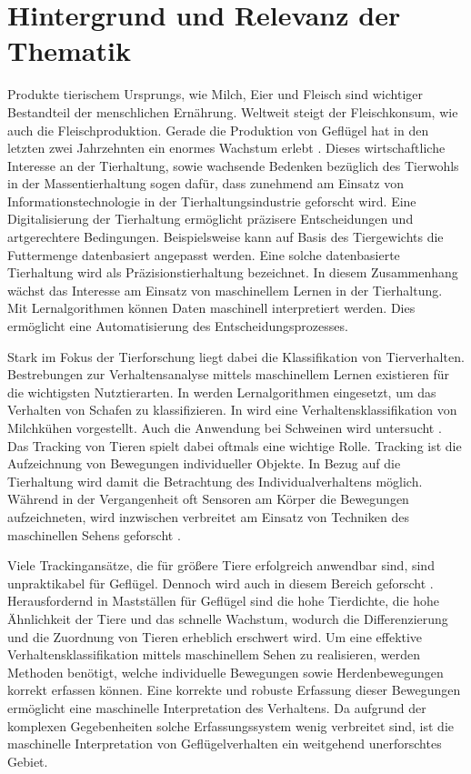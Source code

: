 \section{Hintergrund und Relevanz der Thematik} \label{sec:Hintergrund}
Produkte tierischem Ursprungs, wie Milch, Eier und Fleisch sind wichtiger Bestandteil der menschlichen Ernährung. Weltweit steigt der Fleischkonsum, wie auch die Fleischproduktion. Gerade die Produktion von Geflügel hat in den letzten zwei Jahrzehnten ein enormes Wachstum erlebt \cite{StatistischesBundesamt.20200212}. Dieses wirtschaftliche Interesse an der Tierhaltung, sowie wachsende Bedenken bezüglich des Tierwohls in der Massentierhaltung sogen dafür, dass zunehmend am Einsatz von Informationstechnologie in der Tierhaltungsindustrie geforscht wird. Eine Digitalisierung der Tierhaltung ermöglicht präzisere Entscheidungen und artgerechtere Bedingungen. Beispielsweise kann auf Basis des Tiergewichts die Futtermenge datenbasiert angepasst werden. Eine solche datenbasierte Tierhaltung wird als Präzisionstierhaltung bezeichnet. In diesem Zusammenhang wächst das Interesse am Einsatz von maschinellem Lernen in der Tierhaltung. Mit Lernalgorithmen können Daten maschinell interpretiert werden. Dies ermöglicht eine Automatisierung des Entscheidungsprozesses\cite{Garcia.2020}.\par

Stark im Fokus der Tierforschung liegt dabei die Klassifikation von Tierverhalten. Bestrebungen zur Verhaltensanalyse mittels maschinellem Lernen existieren für die wichtigsten Nutztierarten. In \cite{VazquezDiosdado.2019} werden Lernalgorithmen eingesetzt, um das Verhalten von Schafen zu klassifizieren. In \cite{VazquezDiosdado.2015} wird eine Verhaltensklassifikation von Milchkühen vorgestellt. Auch die Anwendung bei Schweinen wird untersucht \cite{Tran.2023}. Das Tracking von Tieren spielt dabei oftmals eine wichtige Rolle. Tracking ist die Aufzeichnung von Bewegungen individueller Objekte. In Bezug auf die Tierhaltung wird damit die Betrachtung des Individualverhaltens möglich. Während in der Vergangenheit oft Sensoren am Körper die Bewegungen aufzeichneten, wird inzwischen verbreitet am Einsatz von Techniken des maschinellen Sehens geforscht \cite{Cowton.2019, Li.2020, Chen.2023}.\par

Viele Trackingansätze, die für größere Tiere erfolgreich anwendbar sind, sind unpraktikabel für Geflügel. Dennoch wird auch in diesem Bereich geforscht \cite{Chen.2023, Gonzalez.2020, Nasirahmadi.2020}. Herausfordernd in Mastställen für Geflügel sind die hohe Tierdichte, die hohe Ähnlichkeit der Tiere und das schnelle Wachstum, wodurch die Differenzierung und die Zuordnung von Tieren erheblich erschwert wird. Um eine effektive Verhaltensklassifikation mittels maschinellem Sehen zu realisieren, werden Methoden benötigt, welche individuelle Bewegungen sowie Herdenbewegungen korrekt erfassen können. Eine korrekte und robuste Erfassung dieser Bewegungen ermöglicht eine maschinelle Interpretation des Verhaltens. Da aufgrund der komplexen Gegebenheiten solche Erfassungssystem wenig verbreitet sind, ist die maschinelle Interpretation von Geflügelverhalten ein weitgehend unerforschtes Gebiet. \par

